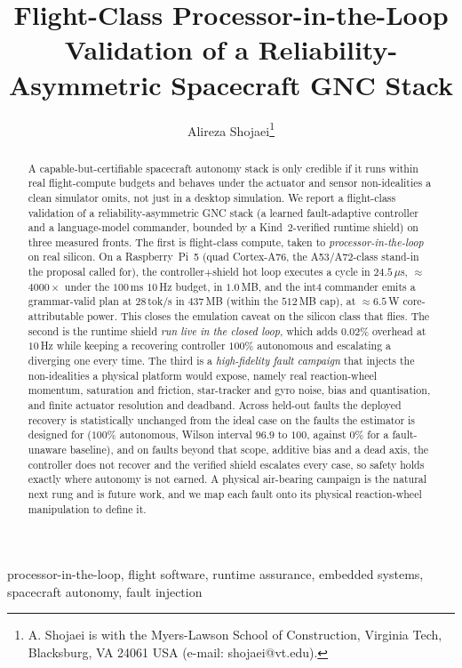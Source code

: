 \documentclass[journal]{IEEEtran}
\title{Flight-Class Processor-in-the-Loop Validation of a Reliability-Asymmetric Spacecraft GNC Stack}
\author{Alireza Shojaei\thanks{A. Shojaei is with the Myers-Lawson School of Construction, Virginia Tech, Blacksburg, VA 24061 USA (e-mail: shojaei@vt.edu).}}
\begin{document}
\maketitle

\begin{abstract}
A capable-but-certifiable spacecraft autonomy stack is only credible if it runs within real
flight-compute budgets and behaves under the actuator and sensor non-idealities a clean
simulator omits, not just in a desktop simulation. We report a flight-class validation of a
reliability-asymmetric GNC stack (a learned fault-adaptive controller and a language-model
commander, bounded by a Kind~2-verified runtime shield) on three measured fronts. The first is
flight-class compute, taken to \emph{processor-in-the-loop} on real silicon. On a
Raspberry~Pi~5 (quad Cortex-A76, the A53/A72-class stand-in the proposal called for), the
controller$+$shield hot loop executes a cycle in $24.5\,\mu$s, $\approx$$4000\times$ under the
$100$\,ms $10$\,Hz budget, in $1.0$\,MB, and the int4 commander emits a grammar-valid plan at
$28$\,tok/s in $437$\,MB (within the $512$\,MB cap), at $\approx$$6.5$\,W core-attributable
power. This closes the emulation caveat on the silicon class that flies. The second is the
runtime shield \emph{run live in the closed loop}, which adds $0.02\%$ overhead at $10$\,Hz
while keeping a recovering controller $100\%$ autonomous and escalating a diverging one every
time. The third is a \emph{high-fidelity fault campaign} that injects the non-idealities a
physical platform would expose, namely real reaction-wheel momentum, saturation and friction,
star-tracker and gyro noise, bias and quantisation, and finite actuator resolution and
deadband. Across held-out faults the deployed recovery is statistically unchanged from the
ideal case on the faults the estimator is designed for ($100\%$ autonomous, Wilson interval
$96.9$ to $100$, against $0\%$ for a fault-unaware baseline), and on faults beyond that scope,
additive bias and a dead axis, the controller does not recover and the verified shield
escalates every case, so safety holds exactly where autonomy is not earned. A physical
air-bearing campaign is the natural next rung and is future work, and we map each fault onto
its physical reaction-wheel manipulation to define it.
\end{abstract}

\begin{IEEEkeywords}
processor-in-the-loop, flight software, runtime assurance, embedded systems, spacecraft autonomy, fault injection
\end{IEEEkeywords}
\end{document}
